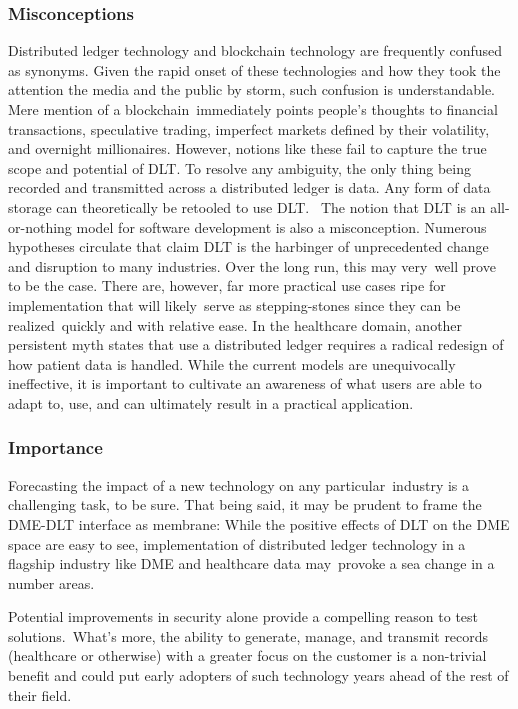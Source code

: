 \documentclass[letterpaper]{article}
\begin{document}
  \subsubsection{Misconceptions}
  Distributed ledger technology and blockchain technology are frequently confused as synonyms. Given the rapid onset of these technologies and how they took the attention the media and the public by storm, such confusion is understandable. Mere mention of a blockchain immediately points people's thoughts to financial transactions, speculative trading, imperfect markets defined by their volatility, and overnight millionaires.
%
  However, notions like these fail to capture the true scope and potential of DLT. To resolve any ambiguity, the only thing being recorded and transmitted across a distributed ledger is data. Any form of data storage can theoretically be retooled to use DLT. 
%
  The notion that DLT is an all-or-nothing model for software development is also a misconception. Numerous hypotheses circulate that claim DLT is the harbinger of unprecedented change and disruption to many industries. Over the long run, this may very well prove to be the case. There are, however, far more practical use cases ripe for implementation that will likely serve as stepping-stones since they can be realized quickly and with relative ease.
%
  In the healthcare domain, another persistent myth states that use a distributed ledger requires a radical redesign of how patient data is handled. While the current models are unequivocally ineffective, it is important to cultivate an awareness of what users are able to adapt to, use, and can ultimately result in a practical application.
%
  \subsubsection{Importance}
  Forecasting the impact of a new technology on any particular industry is a challenging task, to be sure. That being said, it may be prudent to frame the DME-DLT interface as membrane: While the positive effects of DLT on the DME space are easy to see, implementation of distributed ledger technology in a flagship industry like DME and healthcare data may provoke a sea change in a number areas.

  Potential improvements in security alone provide a compelling reason to test solutions. What's more, the ability to generate, manage, and transmit records (healthcare or otherwise) with a greater focus on the customer is a non-trivial benefit and could put early adopters of such technology years ahead of the rest of their field.
\end{document}
